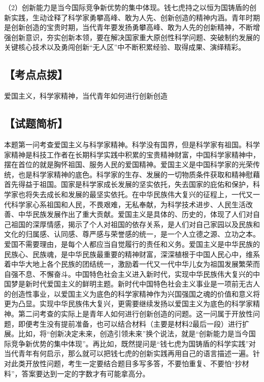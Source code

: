 \documentclass[UTF8,11pt]{ctexart}
\begin{document}
（2）创新能力是当今国际竞争新优势的集中体现。钱七虎持之以恒为国铸盾的创新实践，生动诠释了科学家勇攀高峰、敢为人先、创新创造的精神内涵。青年时期是创新创造的宝贵时期，当代青年要发扬勇攀高峰、敢为人先的创新精神，不断增强创新意识，夯实创新本领，要在解决国家重大原创性科学问题、突破制约发展的关键核心技术以及勇闯创新“无人区”中不断积累经验、取得成果、演绎精彩。


\subsection*{【考点点拨】}

爱国主义，科学家精神，当代青年如何进行创新创造


\subsection*{【试题简析】}

本题第一问考查爱国主义与科学家精神。科学没有国界，但是科学家有祖国。科学家精神是科技工作者在长期科学实践中积累的宝贵精神财富，中国科学家精神中，摆在首位的就是胸怀祖国、服务人民的爱国精神。爱国主义是中国科学家的光荣传统，也是科学家精神的底色。科学家的生存、发展的一切物质条件获取和精神慰藉首先得益于祖国。国家是科学家成长发展的坚实依托，失去国家的庇佑和保护，科学家也将失去成长和发展的最坚实依托。在中华民族伟大复兴的征程上，一代又一代科学家心系祖国和人民，不畏艰难，无私奉献，为科学技术进步、人民生活改善、中华民族发展作出了重大贡献。爱国主义是具体的、历史的，体现了人们对自己祖国的深厚情感，揭示了个人对祖国的依存关系，是人们对自己家园以及民族和文化的归属感、认同感、尊严感与荣誉感的统一，是一个人立德之源、立功之本。爱国不需要理由，是每个人都应当自觉履行的责任和义务。爱国主义是中华民族的民族心、民族魂，是中华民族最重要的精神财富，深深植根于中国人民心中，维系着中华大地上各个民族的团结统一，激励着一代又一代中华儿女为祖国发展繁荣而自强不息、不懈奋斗。中国特色社会主义进入新时代，实现中华民族伟大复兴的中国梦是新时代爱国主义的鲜明主题。新时代中国特色社会主义事业是一项前无古人的创造性事业，以爱国主义为底色的科学家精神作为兴国强国之魂的价值和意义将更为凸显。实现中华民族伟大复兴，更需要继续发扬以爱国主义为底色的科学家精神。第二问考查的实际上是青年人如何进行创新创造的问题。这一问属于开放性问题，即便考生没有提前准备，也可以结合材料（主要是材料2最后一段）进行扩展。比如，将“创新决定未来，创造引领未来”换个说法，就是“创新能力是当今国际竞争新优势的集中体现”。再比如，既然提问是“钱七虎为国铸盾的科学实践”对当代青年有何启示，那么就可以把钱七虎的创新实践再用自己的语言描述一遍。针对此类开放性问题，考生一定要结合题目多写多答，不要怕重复、不要怕“抄材料”，答案要达到一定的字数才有可能拿高分。
\end{document}
